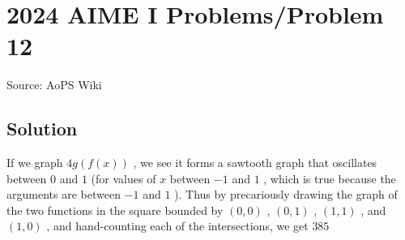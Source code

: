 \documentclass[12pt]{article}
\begin{document}
\section*{{2024 AIME I Problems/Problem 12}}
Source: AoPS Wiki

\subsection*{Solution}
If we graph $4g(f(x))$ , we see it forms a sawtooth graph that oscillates between $0$ and $1$ (for values of $x$ between $-1$ and $1$ , which is true because the arguments are between $-1$ and $1$ ). Thus by precariously drawing the graph of the two functions in the square bounded by $(0,0)$ , $(0,1)$ , $(1,1)$ , and $(1,0)$ , and hand-counting each of the intersections, we get $\boxed{385}$
\end{document}
